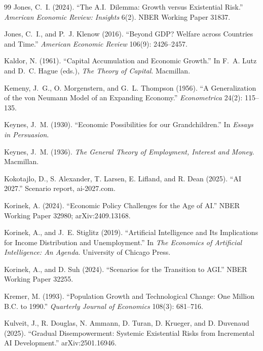 \documentclass[11pt]{article}
\begin{document}
\begin{thebibliography}{99}
Jones, C.~I. (2024). ``The A.I.\ Dilemma: Growth versus Existential Risk.'' \emph{American Economic Review: Insights} 6(2). NBER Working Paper 31837.

Jones, C.~I., and P.~J. Klenow (2016). ``Beyond GDP? Welfare across Countries and Time.'' \emph{American Economic Review} 106(9): 2426--2457.

Kaldor, N. (1961). ``Capital Accumulation and Economic Growth.'' In F.~A. Lutz and D.~C. Hague (eds.), \emph{The Theory of Capital}. Macmillan.

Kemeny, J.~G., O. Morgenstern, and G.~L. Thompson (1956). ``A Generalization of the von Neumann Model of an Expanding Economy.'' \emph{Econometrica} 24(2): 115--135.

Keynes, J.~M. (1930). ``Economic Possibilities for our Grandchildren.'' In \emph{Essays in Persuasion}.

Keynes, J.~M. (1936). \emph{The General Theory of Employment, Interest and Money}. Macmillan.

Kokotajlo, D., S. Alexander, T. Larsen, E. Lifland, and R. Dean (2025). ``AI 2027.'' Scenario report, ai-2027.com.

Korinek, A. (2024). ``Economic Policy Challenges for the Age of AI.'' NBER Working Paper 32980; arXiv:2409.13168.

Korinek, A., and J.~E. Stiglitz (2019). ``Artificial Intelligence and Its Implications for Income Distribution and Unemployment.'' In \emph{The Economics of Artificial Intelligence: An Agenda}. University of Chicago Press.

Korinek, A., and D. Suh (2024). ``Scenarios for the Transition to AGI.'' NBER Working Paper 32255.

Kremer, M. (1993). ``Population Growth and Technological Change: One Million B.C. to 1990.'' \emph{Quarterly Journal of Economics} 108(3): 681--716.

Kulveit, J., R. Douglas, N. Ammann, D. Turan, D. Krueger, and D. Duvenaud (2025). ``Gradual Disempowerment: Systemic Existential Risks from Incremental AI Development.'' arXiv:2501.16946.


\end{thebibliography}
\end{document}

